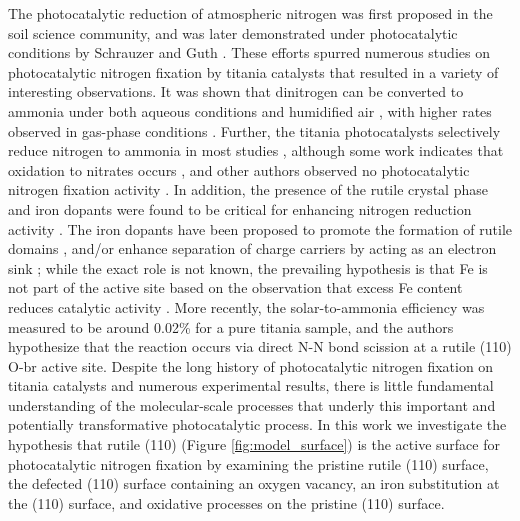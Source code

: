 \documentclass[journal=ascecg,manuscript=article,articletitle=true]{achemso}
\begin{document}
The photocatalytic reduction of atmospheric nitrogen was first proposed in the soil science community\cite{Dhar_1941}, and was later demonstrated under photocatalytic conditions by Schrauzer and Guth \cite{Schrauzer_1977,Schrauzer_1983}. These efforts spurred numerous studies on photocatalytic nitrogen fixation by titania catalysts \cite{Bickley_1979,Augugliaro_1982,Soria_1991,Schrauzer_2011, Yuan_2013,Hirakawa_2017, Medford_2017} that resulted in a variety of interesting observations. It was shown that dinitrogen can be converted to ammonia under both aqueous conditions \cite{Augugliaro_1982,Hirakawa_2017} and humidified air \cite{Schrauzer_1977,Schrauzer_1983}, with higher rates observed in gas-phase conditions \cite{Schrauzer_2011}. Further, the titania photocatalysts selectively reduce nitrogen to ammonia in most studies \cite{Schrauzer_1977,Schrauzer_1983,Augugliaro_1982,Soria_1991,Schrauzer_2011,Hirakawa_2017}, although some work indicates that oxidation to nitrates occurs \cite{Bickley_1979,Yuan_2013}, and other authors observed no photocatalytic nitrogen fixation activity \cite{edwards1992opinion,davies1993reply,Boucher_1995,Davies1995}. In addition, the presence of the rutile crystal phase and iron dopants were found to be critical for enhancing nitrogen reduction activity \cite{Schrauzer_1977,Schrauzer_1983,Augugliaro_1982,Soria_1991}. The iron dopants have been proposed to promote the formation of rutile domains \cite{Schrauzer_1977}, and/or enhance separation of charge carriers by acting as an electron sink \cite{Soria_1991}; while the exact role is not known, the prevailing hypothesis is that Fe is not part of the active site based on the observation that excess Fe content reduces catalytic activity \cite{Soria_1991}. More recently, the solar-to-ammonia efficiency was measured to be around 0.02\% for a pure titania sample, and the authors hypothesize that the reaction occurs via direct N-N bond scission at a rutile (110) O-br active site.\cite{Hirakawa_2017} Despite the long history of photocatalytic nitrogen fixation on titania catalysts and numerous experimental results, there is little fundamental understanding of the molecular-scale processes that underly this important and potentially transformative photocatalytic process. In this work we investigate the hypothesis that rutile (110) (Figure \ref{fig:model_surface}) is the active surface for photocatalytic nitrogen fixation by examining the pristine rutile (110) surface, the defected (110) surface containing an oxygen vacancy, an iron substitution at the (110) surface, and oxidative processes on the pristine (110) surface.
\end{document}

